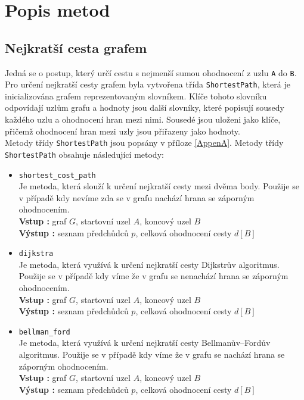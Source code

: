 \section{Popis metod}
\subsection{Nejkratší cesta grafem}

Jedná se o postup, který určí cestu s nejmenší sumou ohodnocení z uzlu \texttt{A} do \texttt{B}. Pro určení nejkratší cesty grafem byla vytvořena třída \texttt{ShortestPath}, která je inicializována grafem reprezentovaným slovníkem. Klíče tohoto slovníku odpovídají uzlům grafu a hodnoty jsou další slovníky, které popisují sousedy každého uzlu a ohodnocení hran mezi nimi. Sousedé jsou uloženi jako klíče, přičemž ohodnocení hran mezi uzly jsou přiřazeny jako hodnoty.\\
Metody třídy \texttt{ShortestPath} jsou popsány v příloze \ref{AppenA}. Metody třídy \texttt{ShortestPath} obsahuje následující metody:
\begin{itemize}
    \item \texttt{shortest\_cost\_path}\\
    Je metoda, která slouží k určení nejkratší cesty mezi dvěma body. Použije se v případě kdy nevíme zda se v grafu nachází hrana se záporným ohodnocením.\\
    \textbf{Vstup : }graf $G$, startovní uzel $A$, koncový uzel $B$\\
    \textbf{Výstup : }seznam předchůdců $p$, celková ohodnocení cesty $d[B]$
    
    \item \texttt{dijkstra}\\
    Je metoda, která využívá k určení nejkratší cesty Dijkstrův algoritmus. Použije se v případě kdy víme že v grafu se nenachází hrana se záporným ohodnocením.\\
    \textbf{Vstup : }graf $G$, startovní uzel $A$, koncový uzel $B$\\
    \textbf{Výstup : }seznam předchůdců $p$, celková ohodnocení cesty $d[B]$

    \item \texttt{bellman\_ford}\\
    Je metoda, která využívá k určení nejkratší cesty Bellmanův–Fordův algoritmus. Použije se v případě kdy víme že v grafu se nachází hrana se záporným ohodnocením.\\
    \textbf{Vstup : }graf $G$, startovní uzel $A$, koncový uzel $B$\\
    \textbf{Výstup : }seznam předchůdců $p$, celková ohodnocení cesty $d[B]$
\end{itemize}



